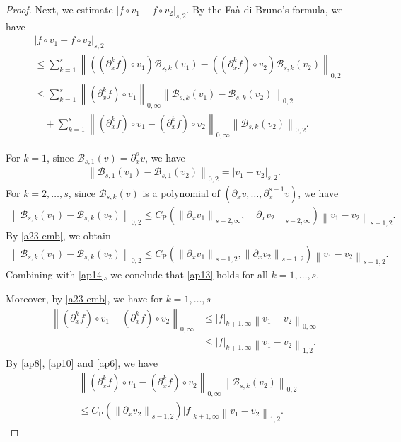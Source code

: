 \documentclass[10pt,a4paper,tbtags,leqno]{amsart}
\theoremstyle{definition}
\numberwithin{equation}{section}
\def\norm#1#2{\left\|#2\right\|_{#1}}
\def\snorm#1#2{\left|#2\right|_{#1}}
\begin{document}
\begin{proof}
  Next, we estimate $ \snorm{s, 2}{f \circ v_1 - f \circ v_2} $. By the Fa\`a di Bruno's formula, we have 
  \begin{align}
    & \snorm{s, 2}{f \circ v_1 - f \circ v_2} \\
    & \leq \sum_{k=1}^s \norm{0, 2}{((\partial_x^k f) \circ v_1) \mathcal{B}_{s, k} (v_1) - ((\partial_x^k f) \circ v_2) \mathcal{B}_{s, k} (v_2)} \\
    & \leq \sum_{k=1}^s \norm{0, \infty}{(\partial_x^k f) \circ v_1} \norm{0, 2}{\mathcal{B}_{s, k} (v_1) - \mathcal{B}_{s, k} (v_2)} \\
    & \quad + \sum_{k=1}^s \norm{0, \infty}{(\partial_x^k f) \circ v_1 - (\partial_x^k f) \circ v_2} \norm{0, 2}{\mathcal{B}_{s, k} (v_2)}. \label{ap4} 
  \end{align} 

  For $ k = 1 $, since $ \mathcal{B}_{s, 1} (v) = \partial_x^s v $, we have 
  \begin{align} 
    \norm{0, 2}{\mathcal{B}_{s, 1} (v_1) - \mathcal{B}_{s, 1} (v_2)} = \snorm{s, 2}{v_1 - v_2}. \label{ap14} 
  \end{align} 
  For $ k = 2, \ldots, s $, since $ \mathcal{B}_{s, k} (v) $ is a polynomial of $ (\partial_x v, \ldots, \partial_x^{s - 1} v) $, we have 
  \begin{align} 
    \norm{0, 2}{\mathcal{B}_{s, k} (v_1) - \mathcal{B}_{s, k} (v_2)} \leq C_{\mathrm{P}} (\norm{s - 2, \infty}{\partial_x v_1}, \norm{s - 2, \infty}{\partial_x v_2}) \norm{s - 1, 2}{v_1 - v_2}. 
  \end{align} 
  By \eqref{a23-emb}, we obtain 
  \begin{align} 
    \norm{0, 2}{\mathcal{B}_{s, k} (v_1) - \mathcal{B}_{s, k} (v_2)} \leq C_{\mathrm{P}} (\norm{s - 1, 2}{\partial_x v_1}, \norm{s - 1, 2}{\partial_x v_2}) \norm{s - 1, 2}{v_1 - v_2}. \label{ap13} 
  \end{align} 
  Combining with \eqref{ap14}, we conclude that \eqref{ap13} holds for all $ k = 1, \ldots, s $. 

  Moreover, by \eqref{a23-emb}, we have for $ k = 1,\ldots,s $ 
  \begin{align}
    \norm{0, \infty}{(\partial_x^k f) \circ v_1 - (\partial_x^k f) \circ v_2} & \leq \snorm{k + 1, \infty}{f} \norm{0, \infty}{v_1 - v_2} \\
    & \leq \snorm{k + 1, \infty}{f} \norm{1, 2}{v_1 - v_2}. \label{ap6}
  \end{align} 
  By \eqref{ap8}, \eqref{ap10} and \eqref{ap6}, we have 
  \begin{align} 
      & \norm{0, \infty}{(\partial_x^k f) \circ v_1 - (\partial_x^k f) \circ v_2} \norm{0, 2}{\mathcal{B}_{s, k} (v_2)} \\ & \leq C_{\mathrm{P}} (\norm{s - 1, 2}{\partial_x v_2}) \snorm{k + 1, \infty}{f} \norm{1, 2}{v_1 - v_2}. \label{ap6-2}
  \end{align} 


\end{proof}
\end{document}
